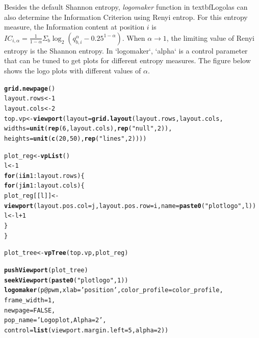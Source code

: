 \documentclass[12pt]{article}\usepackage[]{graphicx}\usepackage[usenames,dvipsnames]{color}
\makeatletter
\newcommand{\hlnum}[1]{\textcolor[rgb]{0.686,0.059,0.569}{#1}}%
\newcommand{\hlstr}[1]{\textcolor[rgb]{0.192,0.494,0.8}{#1}}%
\newcommand{\hlopt}[1]{\textcolor[rgb]{0,0,0}{#1}}%
\newcommand{\hlstd}[1]{\textcolor[rgb]{0.345,0.345,0.345}{#1}}%
\newcommand{\hlkwa}[1]{\textcolor[rgb]{0.161,0.373,0.58}{\textbf{#1}}}%
\newcommand{\hlkwb}[1]{\textcolor[rgb]{0.69,0.353,0.396}{#1}}%
\newcommand{\hlkwc}[1]{\textcolor[rgb]{0.333,0.667,0.333}{#1}}%
\newcommand{\hlkwd}[1]{\textcolor[rgb]{0.737,0.353,0.396}{\textbf{#1}}}%
\newenvironment{kframe}{%
 \def\at@end@of@kframe{}%
 \ifinner\ifhmode%
  \def\at@end@of@kframe{\end{minipage}}%
  \begin{minipage}{\columnwidth}%
 \fi\fi%
 \def\FrameCommand##1{\hskip\@totalleftmargin \hskip-\fboxsep
 \colorbox{shadecolor}{##1}\hskip-\fboxsep
     \hskip-\linewidth \hskip-\@totalleftmargin \hskip\columnwidth}%
 \MakeFramed {\advance\hsize-\width
   \@totalleftmargin\z@ \linewidth\hsize
   \@setminipage}}%
 {\par\unskip\endMakeFramed%
 \at@end@of@kframe}
\newenvironment{knitrout}{}{} %
\makeatother
\begin{document}
Besides the default Shannon entropy, \textit{logomaker} function in
textbf{Logolas} can also determine the Information Criterion using Renyi entrop. For this entropy measure, the Information content at position $i$ is $IC_{i,\alpha}=\frac{1}{1-\alpha}\Sigma_b\log_2(q_{b,i}^\alpha-0.25^{1-\alpha})$. When $\alpha\rightarrow1$, the limiting value of Renyi entropy is the Shannon entropy. In `logomaker`, `alpha` is a control parameter that can be tuned to get plots for different entropy measures. The figure below shows the logo plots with different values of $\alpha$.

\begin{knitrout}
\color{fgcolor}\begin{kframe}
\begin{alltt}
\hlkwd{grid.newpage}\hlstd{()}
\hlstd{layout.rows} \hlkwb{<-} \hlnum{1}
\hlstd{layout.cols} \hlkwb{<-} \hlnum{2}
\hlstd{top.vp} \hlkwb{<-} \hlkwd{viewport}\hlstd{(}\hlkwc{layout}\hlstd{=}\hlkwd{grid.layout}\hlstd{(layout.rows, layout.cols,}
                                      \hlkwc{widths}\hlstd{=}\hlkwd{unit}\hlstd{(}\hlkwd{rep}\hlstd{(}\hlnum{6}\hlstd{,layout.cols),} \hlkwd{rep}\hlstd{(}\hlstr{"null"}\hlstd{,} \hlnum{2}\hlstd{)),}
                                      \hlkwc{heights}\hlstd{=}\hlkwd{unit}\hlstd{(}\hlkwd{c}\hlstd{(}\hlnum{20}\hlstd{,}\hlnum{50}\hlstd{),} \hlkwd{rep}\hlstd{(}\hlstr{"lines"}\hlstd{,} \hlnum{2}\hlstd{))))}

\hlstd{plot_reg} \hlkwb{<-} \hlkwd{vpList}\hlstd{()}
\hlstd{l} \hlkwb{<-} \hlnum{1}
\hlkwa{for}\hlstd{(i} \hlkwa{in} \hlnum{1}\hlopt{:}\hlstd{layout.rows)\{}
  \hlkwa{for}\hlstd{(j} \hlkwa{in} \hlnum{1}\hlopt{:}\hlstd{layout.cols)\{}
    \hlstd{plot_reg[[l]]} \hlkwb{<-} \hlkwd{viewport}\hlstd{(}\hlkwc{layout.pos.col} \hlstd{= j,} \hlkwc{layout.pos.row} \hlstd{= i,} \hlkwc{name} \hlstd{=} \hlkwd{paste0}\hlstd{(}\hlstr{"plotlogo"}\hlstd{, l))}
    \hlstd{l} \hlkwb{<-} \hlstd{l}\hlopt{+}\hlnum{1}
  \hlstd{\}}
\hlstd{\}}


\hlstd{plot_tree} \hlkwb{<-} \hlkwd{vpTree}\hlstd{(top.vp, plot_reg)}

\hlkwd{pushViewport}\hlstd{(plot_tree)}
\hlkwd{seekViewport}\hlstd{(}\hlkwd{paste0}\hlstd{(}\hlstr{"plotlogo"}\hlstd{,} \hlnum{1}\hlstd{))}
\hlkwd{logomaker}\hlstd{(p}\hlopt{@}\hlkwc{pwm}\hlstd{,}\hlkwc{xlab} \hlstd{=} \hlstr{'position'}\hlstd{,}\hlkwc{color_profile} \hlstd{= color_profile,}
          \hlkwc{frame_width} \hlstd{=} \hlnum{1}\hlstd{,}
          \hlkwc{newpage} \hlstd{=} \hlnum{FALSE}\hlstd{,}
          \hlkwc{pop_name} \hlstd{=} \hlstr{'Logo plot, Alpha=2'}\hlstd{,}
          \hlkwc{control} \hlstd{=} \hlkwd{list}\hlstd{(}\hlkwc{viewport.margin.left} \hlstd{=} \hlnum{5}\hlstd{,}\hlkwc{alpha}\hlstd{=}\hlnum{2}\hlstd{))}



\end{alltt}
\end{kframe}
\end{knitrout}
\end{document}

